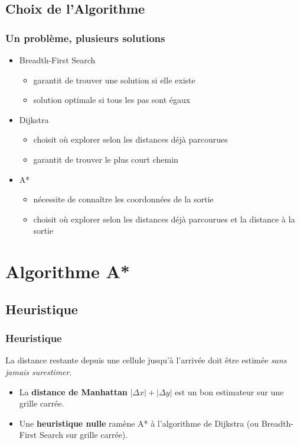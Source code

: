 \documentclass{beamer}
\begin{document}
\subsection{Choix de l'Algorithme}
\begin{frame}
  \frametitle{Un problème, plusieurs solutions}
  \begin{itemize}
  \item<1-> Breadth-First Search
    \begin{itemize}
    \item garantit de trouver une solution si elle existe
    \item solution optimale si tous les pas sont égaux
    \end{itemize}
  \item<2-> Dijkstra
    \begin{itemize}
    \item choisit où explorer selon les distances déjà parcourues
    \item garantit de trouver le plus court chemin
    \end{itemize}    
  \item<3-> A*
    \begin{itemize}
    \item nécessite de connaître les coordonnées de la sortie
    \item choisit où explorer selon les distances déjà parcourues et la distance
      à la sortie
    \end{itemize}
  \end{itemize}
\end{frame}

\section{Algorithme A*}
\subsection{Heuristique}
\begin{frame}
  \frametitle{Heuristique}
  La distance restante depuis une cellule jusqu'à l'arrivée doit être estimée
  \textit{sans jamais surestimer}.
  \begin{itemize}
  \item<2->{La \textbf{distance de Manhattan} $|\Delta x| + |\Delta y|$
    est un bon estimateur sur une grille carrée.}
  \par
  \item<3>{Une \textbf{heuristique nulle} ramène A* à l'algorithme de Dijkstra
      (ou Breadth-First Search sur grille carrée).}
  \end{itemize}
\end{frame}
\end{document}
